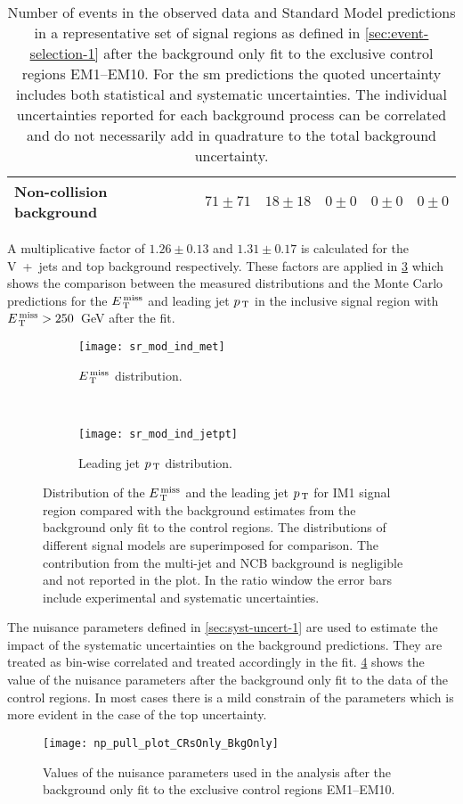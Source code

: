 \begin{table}[!htb]
{\begin{tabular}{lccccc}
    Non-collision background & $71 \pm 71$ & $18 \pm 18$ & $0 \pm 0$
                             & $0 \pm 0$ & $0 \pm 0$ \\
    \bottomrule
  \end{tabular}}
\caption{Number of events in the observed data and Standard Model predictions in
  a representative set of signal regions as defined in
  \cref{sec:event-selection-1} after the background only fit to the exclusive
  control regions EM1--EM10. For the \gls{sm} predictions the quoted uncertainty
  includes both statistical and systematic uncertainties. The individual
  uncertainties reported for each background process can be correlated and do
  not necessarily add in quadrature to the total background uncertainty.}
  \label{tab:results}
\end{table}
A multiplicative factor of $1.26 \pm 0.13$ and $1.31 \pm 0.17$ is calculated for
the V~+~jets and top background respectively. These factors are applied in
\cref{fig:sr_plots_2016} which shows the comparison between the measured
distributions and the Monte Carlo predictions for the $E_\mathrm{\, T}^\mathrm{\, miss}$ and leading jet
$p_\mathrm{\, T}$ in the inclusive signal region with $E_\mathrm{\, T}^\mathrm{\, miss} > 250$~GeV after the fit.
\begin{figure}[!htb]
  \centering
  \begin{subfigure}[t]{.63\linewidth}
    \texttt{[image: sr\_mod\_ind\_met]}
    \caption{$E_\mathrm{\, T}^\mathrm{\, miss}$ distribution.}
    \label{fig:sr_et_miss_2016}
  \end{subfigure} \\
  \begin{subfigure}[t]{.63\linewidth}
    \texttt{[image: sr\_mod\_ind\_jetpt]}
    \caption{Leading jet $p_\mathrm{\, T}$ distribution.}
    \label{fig:sr_jet1_pt_2016}
  \end{subfigure}
  \caption{Distribution of the $E_\mathrm{\, T}^\mathrm{\, miss}$ and the leading jet $p_\mathrm{\, T}$ for IM1 signal
    region compared with the background estimates from the background only fit
    to the control regions. The distributions of different signal models are
    superimposed for comparison. The contribution from the multi-jet and NCB
    background is negligible and not reported in the plot. In the ratio window
    the error bars include experimental and systematic uncertainties.}
  \label{fig:sr_plots_2016}
\end{figure}

The nuisance parameters defined in \cref{sec:syst-uncert-1} are used to estimate
the impact of the systematic uncertainties on the background predictions. They
are treated as bin-wise correlated and treated accordingly in the
fit. \cref{fig:np_pull} shows the value of the nuisance parameters after the
background only fit to the data of the control regions. In most cases there is a
mild constrain of the parameters which is more evident in the case of the top
uncertainty.
\begin{figure}[!htb]
  \centering
  \texttt{[image: np\_pull\_plot\_CRsOnly\_BkgOnly]}
  \caption{Values of the nuisance parameters used in the analysis after the
    background only fit to the exclusive control regions EM1--EM10.}
  \label{fig:np_pull}
\end{figure}

